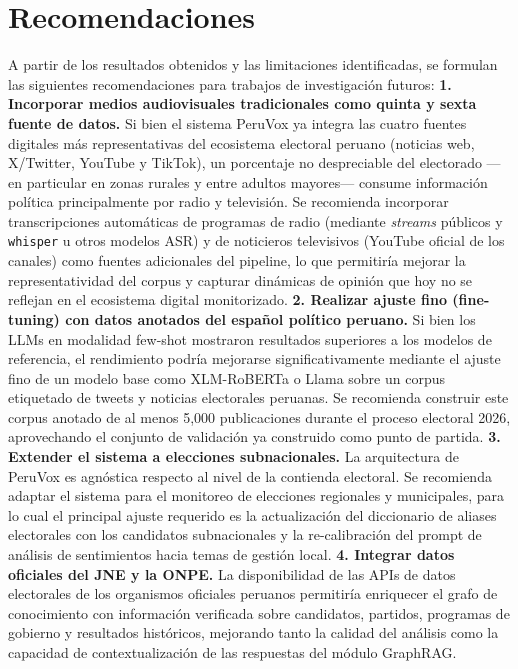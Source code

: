 \documentclass[listof=nochaptergap,12pt,times,authoryear]{report}
\begin{document}
\section{Recomendaciones}
A partir de los resultados obtenidos y las limitaciones identificadas, se formulan
las siguientes recomendaciones para trabajos de investigación futuros:
\textbf{1. Incorporar medios audiovisuales tradicionales como quinta y sexta
fuente de datos.} Si bien el sistema PeruVox ya integra las cuatro fuentes
digitales más representativas del ecosistema electoral peruano (noticias web,
X/Twitter, YouTube y TikTok), un porcentaje no despreciable del electorado —en
particular en zonas rurales y entre adultos mayores— consume información
política principalmente por radio y televisión. Se recomienda incorporar
transcripciones automáticas de programas de radio (mediante \textit{streams}
públicos y \texttt{whisper} u otros modelos ASR) y de noticieros televisivos
(YouTube oficial de los canales) como fuentes adicionales del pipeline, lo que
permitiría mejorar la representatividad del corpus y capturar dinámicas de
opinión que hoy no se reflejan en el ecosistema digital monitorizado.
\textbf{2. Realizar ajuste fino (fine-tuning) con datos anotados del español
político peruano.} Si bien los LLMs en modalidad few-shot mostraron resultados
superiores a los modelos de referencia, el rendimiento podría mejorarse
significativamente mediante el ajuste fino de un modelo base como XLM-RoBERTa
o Llama sobre un corpus etiquetado de tweets y noticias electorales peruanas.
Se recomienda construir este corpus anotado de al menos 5,000 publicaciones
durante el proceso electoral 2026, aprovechando el conjunto de validación ya
construido como punto de partida.
\textbf{3. Extender el sistema a elecciones subnacionales.} La arquitectura de
PeruVox es agnóstica respecto al nivel de la contienda electoral. Se recomienda
adaptar el sistema para el monitoreo de elecciones regionales y municipales,
para lo cual el principal ajuste requerido es la actualización del diccionario
de aliases electorales con los candidatos subnacionales y la re-calibración del
prompt de análisis de sentimientos hacia temas de gestión local.
\textbf{4. Integrar datos oficiales del JNE y la ONPE.} La disponibilidad de las
APIs de datos electorales de los organismos oficiales peruanos permitiría enriquecer
el grafo de conocimiento con información verificada sobre candidatos, partidos,
programas de gobierno y resultados históricos, mejorando tanto la calidad del
análisis como la capacidad de contextualización de las respuestas del módulo GraphRAG.
\end{document}
